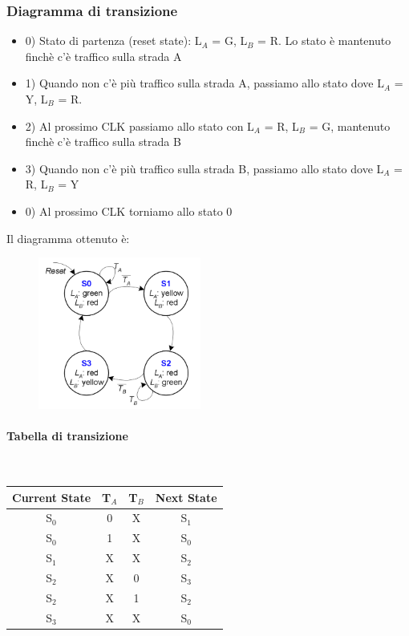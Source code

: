 \documentclass{report}
\newcommand{\subsubsubsection}[1]{\paragraph{#1}\mbox{}\\}
\begin{document}
            \subsubsection{Diagramma di transizione}
                \begin{itemize}
                    \item 0) Stato di partenza (reset state): L$_A$ = G, L$_B$ = R. Lo stato è mantenuto finchè c'è traffico sulla strada A
                    \item 1) Quando non c'è più traffico sulla strada A, passiamo allo stato dove L$_A$ = Y, L$_B$ = R.
                    \item 2) Al prossimo CLK passiamo allo stato con L$_A$ = R, L$_B$ = G, mantenuto finchè c'è traffico sulla strada B
                    \item 3) Quando non c'è più traffico sulla strada B, passiamo allo stato dove L$_A$ = R, L$_B$ = Y
                    \item 0) Al prossimo CLK torniamo allo stato 0
                \end{itemize}
                Il diagramma ottenuto è:
                \begin{center}
                    \begin{figure}[H]
                        \includegraphics[width=\textwidth, height=5cm]{fsmd.png}
                    \end{figure}
                \end{center}
            \subsubsubsection{Tabella di transizione}
                \begin{center}
                    \begin{tabular}{|c|c|c|c|}
                        \hline
                        Current State & T$_A$ & T$_B$ & Next State \\
                        \hline
                        S$_0$ & 0 & X & S$_1$ \\
                        \hline
                        S$_0$ & 1 & X & S$_0$ \\
                        \hline
                        S$_1$ & X & X & S$_2$ \\
                        \hline
                        S$_2$ & X & 0 & S$_3$ \\
                        \hline
                        S$_2$ & X & 1 & S$_2$ \\
                        \hline
                        S$_3$ & X & X & S$_0$ \\
                        \hline
                    \end{tabular}
                \end{center}
\end{document}

